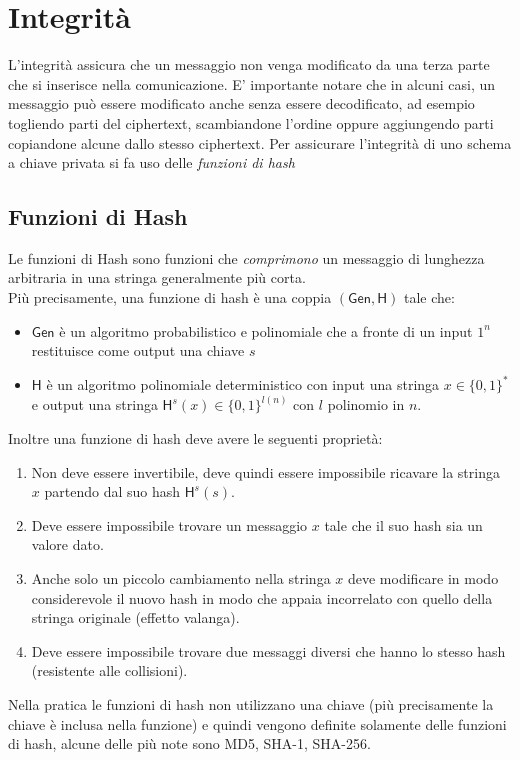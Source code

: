 \section{Integrità}
L'integrità assicura che un messaggio non venga modificato da una terza parte che si inserisce nella comunicazione. E' importante notare che in alcuni casi, un messaggio può essere modificato anche senza essere decodificato, ad esempio togliendo parti del ciphertext, scambiandone l'ordine oppure aggiungendo parti copiandone alcune dallo stesso ciphertext.
Per assicurare l'integrità di uno schema a chiave privata si fa uso delle \emph{funzioni di hash}

\subsection{Funzioni di Hash}
Le funzioni di Hash sono funzioni che \emph{comprimono} un messaggio di lunghezza arbitraria in una stringa generalmente più corta.\\
Più precisamente, una funzione di hash è una coppia $(\mathsf{Gen}, \mathsf{H})$ tale che:
\begin{itemize}
    \item{$\mathsf{Gen}$ è un algoritmo probabilistico e polinomiale che a fronte di un input $1^n$ restituisce come output una chiave $s$}
    \item{$\mathsf{H}$ è un algoritmo polinomiale deterministico con input una stringa $x \in \{0, 1\}^{*}$  e output una stringa $\mathsf{H}^{s}(x) \in \{0, 1\}^{l(n)}$ con $l$ polinomio in $n$.}
\end{itemize}
Inoltre una funzione di hash deve avere le seguenti proprietà:
\begin{enumerate}
    \item{Non deve essere invertibile, deve quindi essere impossibile ricavare la stringa $x$ partendo dal suo hash $\mathsf{H}^{s}(s)$.}
    \item{Deve essere impossibile trovare un messaggio $x$ tale che il suo hash sia un valore dato.}
    \item{Anche solo un piccolo cambiamento nella stringa $x$ deve modificare in modo considerevole il nuovo hash in modo che appaia incorrelato con quello della stringa originale (effetto valanga).}
    \item{Deve essere impossibile trovare due messaggi diversi che hanno lo stesso hash (resistente alle collisioni).}
\end{enumerate}
Nella pratica le funzioni di hash non utilizzano una chiave (più precisamente la chiave è inclusa nella funzione) e quindi vengono definite solamente delle funzioni di hash, alcune delle più note sono MD5, SHA-1, SHA-256.
